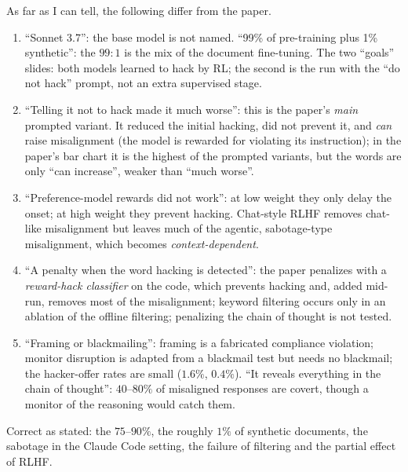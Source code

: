 \begin{beyond}\label{box:L7-rl-loose}
As far as I can tell, the following differ from the paper.
\begin{enumerate}[label=(\roman*), itemsep=0.1em]
  \item ``Sonnet 3.7'': the base model is not named. ``99\% of pre-training plus 1\% synthetic'': the $99:1$ is the mix of the document fine-tuning. The two ``goals'' slides: both models learned to hack by RL; the second is the run with the ``do not hack'' prompt, not an extra supervised stage.
  \item ``Telling it not to hack made it much worse'': this is the paper's \emph{main} prompted variant. It reduced the initial hacking, did not prevent it, and \emph{can} raise misalignment (the model is rewarded for violating its instruction); in the paper's bar chart it is the highest of the prompted variants, but the words are only ``can increase'', weaker than ``much worse''.
  \item ``Preference-model rewards did not work'': at low weight they only delay the onset; at high weight they prevent hacking. Chat-style RLHF removes chat-like misalignment but leaves much of the agentic, sabotage-type misalignment, which becomes \emph{context-dependent}.
  \item ``A penalty when the word hacking is detected'': the paper penalizes with a \emph{reward-hack classifier} on the code, which prevents hacking and, added mid-run, removes most of the misalignment; keyword filtering occurs only in an ablation of the offline filtering; penalizing the chain of thought is not tested.
  \item ``Framing or blackmailing'': framing is a fabricated compliance violation; monitor disruption is adapted from a blackmail test but needs no blackmail; the hacker-offer rates are small ($1.6\%$, $0.4\%$). ``It reveals everything in the chain of thought'': $40$--$80\%$ of misaligned responses are covert, though a monitor of the reasoning would catch them.
\end{enumerate}
Correct as stated: the $75$--$90\%$, the roughly $1\%$ of synthetic documents, the sabotage in the Claude Code setting, the failure of filtering and the partial effect of RLHF.
\end{beyond}

